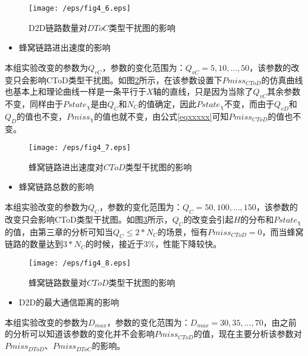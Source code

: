 \documentclass[figurelist,tablelist,algorithmlist,nomlist,masters]{seuthesix}
\begin{document}
	\begin{figure}[!h]
		\centering
		\texttt{[image: /eps/fig4\_6.eps]}
		\caption{D2D链路数量对$DToC$类型干扰图的影响}
		\label{fig4_6}
	\end{figure}


	\begin{itemize}
		\item 蜂窝链路进出速度的影响
	\end{itemize}
	
	本组实验改变的参数为$Q_{vC}$，参数的变化范围为：$Q_{vC} = 5,10,...,50$，该参数的改变只会影响CToD类型干扰图。如图\ref{fig4_7}所示，在该参数设置下$Pmiss_{CToD}$的仿真曲线也基本上和理论曲线一样是一条平行于$X$轴的直线，只是因为当除了$Q_{vC}$其余参数不变，同样由于$Pstate_{\chi }$是由$Q_C$和$N_C$的值确定，因此$Pstate_{\chi }$不变，而由于$Q_{vD}$和$Q_D$的值也不变，$Pmiss_{\chi }$的值也就不变，由公式\ref{eqxxxxx}可知$Pmiss_{CToD}$的值也不变。
	
	\begin{figure}[!h]
		\centering
		\texttt{[image: /eps/fig4\_7.eps]}
		\caption{蜂窝链路进出速度对$CToD$类型干扰图的影响}
		\label{fig4_7}
	\end{figure}

	
	\begin{itemize}
		\item 蜂窝链路总数的影响
	\end{itemize}
	
	本组实验改变的参数为$Q_{C}$，参数的变化范围为：$Q_{C} = 50,100,...,150$，该参数的改变只会影响CToD类型干扰图。如图\ref{fig4_8}所示，$Q_{C}$的改变会引起$H$的分布和$Pstate_{\chi }$的值，由第三章的分析可知当$Q_{C} \le 2 * N_C$的场景，恒有$Pmiss_{CToD} = 0$，而当蜂窝链路的数量达到$3 * N_{C}$的时候，接近于$3\%$，性能下降较快。

	\begin{figure}[!h]
		\centering
		\texttt{[image: /eps/fig4\_8.eps]}
		\caption{蜂窝链路数量对$CToD$类型干扰图的影响}
		\label{fig4_8}
	\end{figure}

	
	\begin{itemize}
		\item D2D的最大通信距离的影响
	\end{itemize}
	
	本组实验改变的参数为$D_{max}$，参数的变化范围为：$D_{max} = 30,35,...,70$，由之前的分析可以知道该参数的变化并不会影响$Pmiss_{CToD}$的值，现在主要分析该参数对$Pmiss_{DToD}$、$Pmiss_{DToC}$的影响。
	
\end{document}
